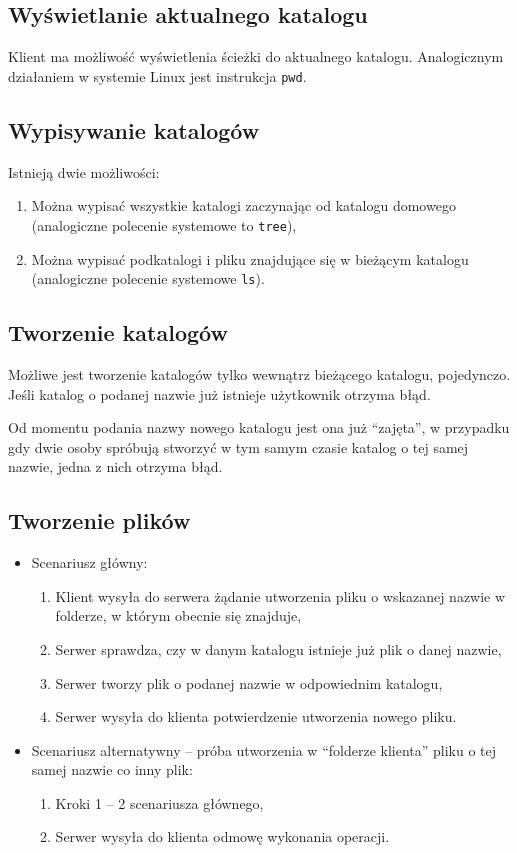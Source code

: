\documentclass[10pt,a4paper]{article}
\newcommand{\quotes}[1]{``#1''}
\begin{document}
\subsection{Wyświetlanie aktualnego katalogu}
Klient ma możliwość wyświetlenia ścieżki do aktualnego katalogu. Analogicznym działaniem w systemie Linux jest instrukcja \texttt{pwd}.

\subsection{Wypisywanie katalogów}
\noindent Istnieją dwie możliwości:
\begin{enumerate}
    \item Można wypisać wszystkie katalogi zaczynając od katalogu domowego (analogiczne polecenie systemowe to \texttt{tree}),
    \item Można wypisać podkatalogi i pliku znajdujące się w bieżącym katalogu (analogiczne polecenie systemowe \texttt{ls}).
\end{enumerate}

\subsection{Tworzenie katalogów}
Możliwe jest tworzenie katalogów tylko wewnątrz bieżącego katalogu, pojedynczo. Jeśli katalog o podanej nazwie już istnieje użytkownik otrzyma błąd.

Od momentu podania nazwy nowego katalogu jest ona już \quotes{zajęta}, w przypadku gdy dwie osoby spróbują stworzyć w tym samym czasie katalog o tej samej nazwie, jedna z nich otrzyma błąd.

\subsection{Tworzenie plików}
\begin{itemize}
    \item Scenariusz główny:
    \begin{enumerate}
        \item Klient wysyła do serwera żądanie utworzenia pliku o wskazanej nazwie w folderze, w którym obecnie się znajduje,
        \item Serwer sprawdza, czy w danym katalogu istnieje już plik o danej nazwie,
        \item Serwer tworzy plik o podanej nazwie w odpowiednim katalogu,
        \item Serwer wysyła do klienta potwierdzenie utworzenia nowego pliku.
    \end{enumerate}

    \item Scenariusz alternatywny -- próba utworzenia w \quotes{folderze klienta} pliku o tej samej nazwie co inny plik:
    \begin{enumerate}
        \item Kroki 1 -- 2 scenariusza głównego,
        \item Serwer wysyła do klienta odmowę wykonania operacji.
    \end{enumerate}
\end{itemize}
\end{document}
